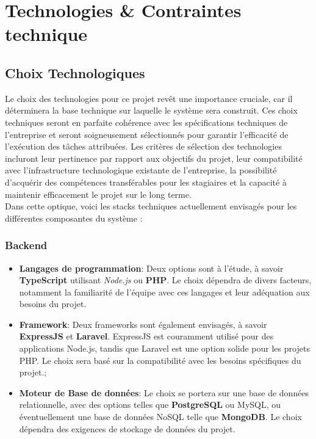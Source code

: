 \chapter{Technologies \& Contraintes technique }

\section{Choix Technologiques}
Le choix des technologies pour ce projet revêt une importance cruciale, car il déterminera la base technique sur laquelle le système sera construit. Ces choix techniques seront en parfaite cohérence avec les spécifications techniques de l'entreprise et seront soigneusement sélectionnés pour garantir l'efficacité de l'exécution des tâches attribuées. Les critères de sélection des technologies incluront leur pertinence par rapport aux objectifs du projet, leur compatibilité avec l'infrastructure technologique existante de l'entreprise, la possibilité d'acquérir des compétences transférables pour les stagiaires et la capacité à maintenir efficacement le projet sur le long terme.
\\
Dans cette optique, voici les stacks techniques actuellement envisagés pour les différentes composantes du système : 
\subsection{Backend}
\begin{itemize}
    \item \textbf{Langages de programmation}: Deux options sont à l'étude, à savoir \textbf{TypeScript} utilisant \textit{Node.js} ou \textbf{PHP}. Le choix dépendra de divers facteurs, notamment la familiarité de l'équipe avec ces langages et leur adéquation aux besoins du projet.
    \item \textbf{Framework}: Deux frameworks sont également envisagés, à savoir \textbf{ExpressJS} et \textbf{Laravel}. ExpressJS est couramment utilisé pour des applications Node.js, tandis que Laravel est une option solide pour les projets PHP. Le choix sera basé sur la compatibilité avec les besoins spécifiques du projet.;
    \item \textbf{Moteur de Base de données}: Le choix se portera sur une base de données relationnelle, avec des options telles que \textbf{PostgreSQL} ou MySQL, ou éventuellement une base de données NoSQL telle que \textbf{MongoDB}. Le choix dépendra des exigences de stockage de données du projet.
\end{itemize}

